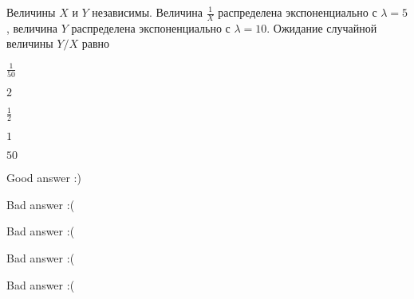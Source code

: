 
\begin{question}
Величины \(X\) и \(Y\) независимы. Величина \(\frac{1}{X}\) распределена
экспоненциально с \(\lambda=5\), величина \(Y\) распределена
экспоненциально с \(\lambda=10\). Ожидание случайной величины \(Y/X\)
равно
\begin{answerlist}
  \item \(\frac{1}{50}\)
  \item \(2\)
  \item \(\frac{1}{2}\)
  \item \(1\)
  \item \(50\)
\end{answerlist}
\end{question}

\begin{solution}
\begin{answerlist}
  \item Good answer :)
  \item Bad answer :(
  \item Bad answer :(
  \item Bad answer :(
  \item Bad answer :(
\end{answerlist}
\end{solution}

